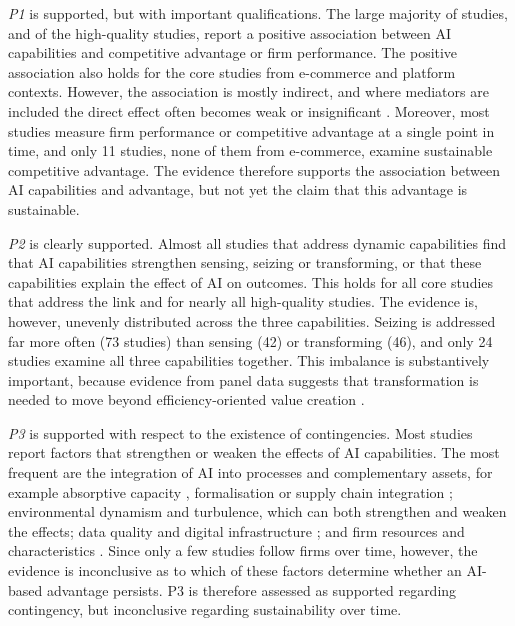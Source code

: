 \emph{P1} is supported, but with important qualifications. The large majority of studies, and of the high-quality studies, report a positive association between AI capabilities and competitive advantage or firm performance. The positive association also holds for the core studies from e-commerce and platform contexts. However, the association is mostly indirect, and where mediators are included the direct effect often becomes weak or insignificant . Moreover, most studies measure firm performance or competitive advantage at a single point in time, and only 11 studies, none of them from e-commerce, examine sustainable competitive advantage. The evidence therefore supports the association between AI capabilities and advantage, but not yet the claim that this advantage is sustainable.

\emph{P2} is clearly supported. Almost all studies that address dynamic capabilities find that AI capabilities strengthen sensing, seizing or transforming, or that these capabilities explain the effect of AI on outcomes. This holds for all core studies that address the link and for nearly all high-quality studies. The evidence is, however, unevenly distributed across the three capabilities. Seizing is addressed far more often (73 studies) than sensing (42) or transforming (46), and only 24 studies examine all three capabilities together. This imbalance is substantively important, because evidence from panel data suggests that transformation is needed to move beyond efficiency-oriented value creation .

\emph{P3} is supported with respect to the existence of contingencies. Most studies report factors that strengthen or weaken the effects of AI capabilities. The most frequent are the integration of AI into processes and complementary assets, for example absorptive capacity , formalisation  or supply chain integration ; environmental dynamism and turbulence, which can both strengthen  and weaken  the effects; data quality and digital infrastructure ; and firm resources and characteristics . Since only a few studies follow firms over time, however, the evidence is inconclusive as to which of these factors determine whether an AI-based advantage persists. P3 is therefore assessed as supported regarding contingency, but inconclusive regarding sustainability over time.

